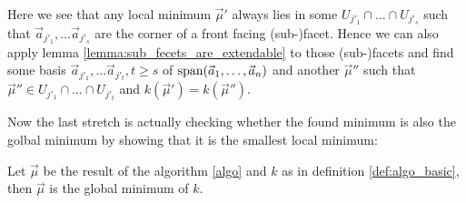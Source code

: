 \begin{observation}
    \label{obs:local_minima_in_front_facets}
    Here we see that any local minimum $\vec\mu'$ always lies in some $U_{j'_1} \cap \dots \cap U_{j'_s}$ such that $\vec a_{j'_1}, \dots \vec a_{j'_s}$ are the corner of a front facing (sub-)facet. Hence we can also apply lemma \ref{lemma:sub_fecets_are_extendable} to those (sub-)facets and find some basis $\vec a_{j'_1}, \dots \vec a_{j'_t}, t \geq s$ of $\operatorname{span}(\vec a_1, \dots, \vec a_n)$ and another $\vec\mu''$ such that $\vec\mu'' \in U_{j'_1} \cap \dots \cap U_{j'_t}$ and $k(\vec\mu') = k(\vec\mu'')$.
\end{observation}


Now the last stretch is actually checking whether the found minimum is also the golbal minimum by showing that it is the smallest local minimum:
\begin{theorem}
    Let $\vec\mu$ be the result of the algorithm \ref{algo} and $k$ as in definition \ref{def:algo_basic}, then $\vec\mu$ is the global minimum of $k$.
\end{theorem}
